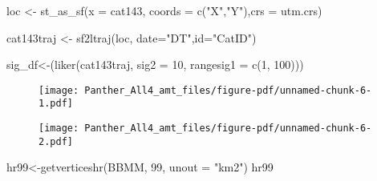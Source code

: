 \documentclass[
  letterpaper,
]{book}
\newenvironment{Shaded}{\begin{snugshade}}{\end{snugshade}}
\newcommand{\AttributeTok}[1]{\textcolor[rgb]{0.40,0.45,0.13}{#1}}
\newcommand{\DecValTok}[1]{\textcolor[rgb]{0.68,0.00,0.00}{#1}}
\newcommand{\FunctionTok}[1]{\textcolor[rgb]{0.28,0.35,0.67}{#1}}
\newcommand{\NormalTok}[1]{\textcolor[rgb]{0.00,0.23,0.31}{#1}}
\newcommand{\OtherTok}[1]{\textcolor[rgb]{0.00,0.23,0.31}{#1}}
\newcommand{\SpecialCharTok}[1]{\textcolor[rgb]{0.37,0.37,0.37}{#1}}
\newcommand{\StringTok}[1]{\textcolor[rgb]{0.13,0.47,0.30}{#1}}
\begin{document}
\begin{Shaded}
\begin{Highlighting}[]
\NormalTok{loc }\OtherTok{\textless{}{-}} \FunctionTok{st\_as\_sf}\NormalTok{(}\AttributeTok{x =}\NormalTok{ cat143, }\AttributeTok{coords =} \FunctionTok{c}\NormalTok{(}\StringTok{"X"}\NormalTok{,}\StringTok{"Y"}\NormalTok{),}\AttributeTok{crs =}\NormalTok{ utm.crs)}

\NormalTok{cat143traj }\OtherTok{\textless{}{-}} \FunctionTok{sf2ltraj}\NormalTok{(loc, }\AttributeTok{date=}\StringTok{"DT"}\NormalTok{,}\AttributeTok{id=}\StringTok{"CatID"}\NormalTok{)}

\NormalTok{sig\_df}\OtherTok{\textless{}{-}}\NormalTok{(}\FunctionTok{liker}\NormalTok{(cat143traj, }\AttributeTok{sig2 =} \DecValTok{10}\NormalTok{, }\AttributeTok{rangesig1 =} \FunctionTok{c}\NormalTok{(}\DecValTok{1}\NormalTok{, }\DecValTok{100}\NormalTok{)))}
\end{Highlighting}
\end{Shaded}

\begin{figure}[H]

{\centering \texttt{[image: Panther\_All4\_amt\_files/figure-pdf/unnamed-chunk-6-1.pdf]}

}

\end{figure}

\begin{Shaded}
\end{Shaded}

\begin{figure}[H]

{\centering \texttt{[image: Panther\_All4\_amt\_files/figure-pdf/unnamed-chunk-6-2.pdf]}

}

\end{figure}

\begin{Shaded}
\begin{Highlighting}[]
\NormalTok{hr99}\OtherTok{\textless{}{-}}\FunctionTok{getverticeshr}\NormalTok{(BBMM, }\DecValTok{99}\NormalTok{, }\AttributeTok{unout =} \StringTok{"km2"}\NormalTok{)}
\NormalTok{hr99}
\end{Highlighting}
\end{Shaded}
\end{document}
